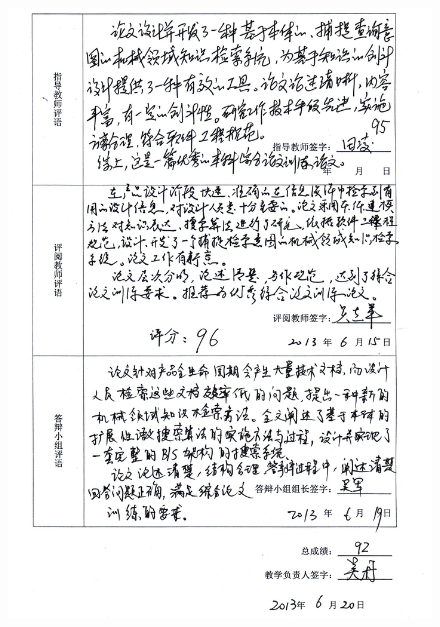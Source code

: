 \documentclass[12pt,a4paper]{article}
\begin{document}
\clearpage
\thispagestyle{empty}
\begin{figure}
\centering\includegraphics[width=6in]{registerTable2.jpg} 
\end{figure}
\end{document}
